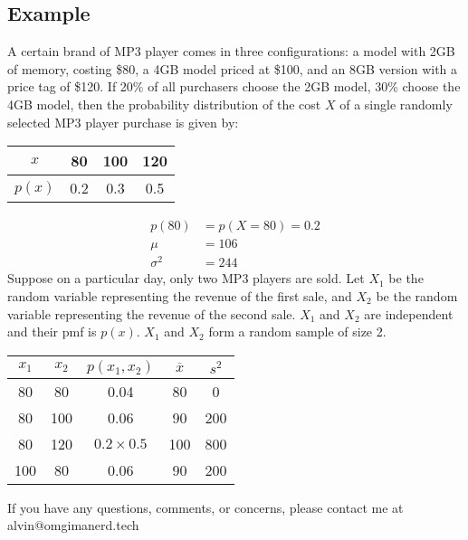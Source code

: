 \documentclass[letterpaper, 12pt]{math}
\begin{document}
\subsection*{Example}
A certain brand of MP3 player comes in three configurations: a model with 2GB
of memory, costing \$80, a 4GB model priced at \$100, and an 8GB version with
a price tag of \$120. If 20\% of all purchasers choose the 2GB model, 30\%
choose the 4GB model, then the probability distribution of the cost \( X \) of
a single randomly selected MP3 player purchase is given by:
\begin{center}
  \begin{tabular}{|c|c|c|c|}
    \hline
    \( x \) & 80 & 100 & 120 \\
    \hline
    \( p(x) \) & 0.2 & 0.3 & 0.5 \\
    \hline
  \end{tabular}
\end{center}
\begin{align*}
  p(80) &= p(X=80) = 0.2 \\
  \mu &= 106 \\
  \sigma^{2} &= 244
\end{align*}
Suppose on a particular day, only two MP3 players are sold. Let \( X_{1} \) be
the random variable representing the revenue of the first sale, and \( X_{2} \)
be the random variable representing the revenue of the second sale. \( X_{1} \)
and \( X_{2} \) are independent and their pmf is \( p(x) \). \( X_{1} \) and
\( X_{2} \) form a random sample of size 2.
\begin{center}
  \begin{tabular}{|c|c|c|c|c|}
    \hline
    \( x_{1} \) & \( x_{2} \) & \( p(x_{1},x_{2}) \) & \( \overline{x} \) &
      \( s^{2} \) \\
    \hline
    80 & 80 & 0.04 & 80 & 0 \\
    \hline
    80 & 100 & 0.06 & 90 & 200 \\
    \hline
    80 & 120 & \( 0.2\times0.5 \) & 100 & 800 \\
    \hline
    100 & 80 & 0.06 & 90 & 200 \\
    \hline
  \end{tabular}
\end{center}

\begin{center}
  If you have any questions, comments, or concerns, please contact me at
  alvin@omgimanerd.tech
\end{center}
\end{document}
